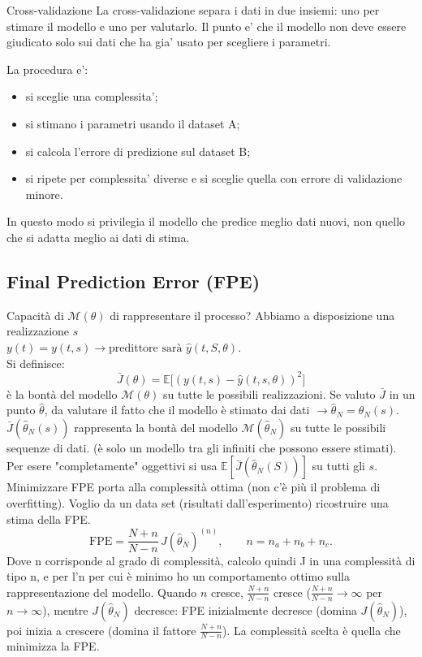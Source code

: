 \documentclass[11pt,a4paper]{article}
\begin{document}
\begin{spiegazione}{Cross-validazione}
La cross-validazione separa i dati in due insiemi: uno per stimare il modello e uno per valutarlo. Il punto e' che il modello non deve essere giudicato solo sui dati che ha gia' usato per scegliere i parametri.

La procedura e':
\begin{itemize}
  \item si sceglie una complessita';
  \item si stimano i parametri usando il dataset A;
  \item si calcola l'errore di predizione sul dataset B;
  \item si ripete per complessita' diverse e si sceglie quella con errore di validazione minore.
\end{itemize}
In questo modo si privilegia il modello che predice meglio dati nuovi, non quello che si adatta meglio ai dati di stima.
\end{spiegazione}




\subsection{Final Prediction Error (FPE)}
Capacità di $\mathcal{M}(\theta)$ di rappresentare il processo? Abbiamo a disposizione una realizzazione $s$ \\
$y(t) = y(t,s) \rightarrow \text{predittore sarà }\hat y(t,S, \theta)$. \\
Si definisce:
\[
\bar J(\theta)=\mathbb{E}\bigl[(y(t,s)-\hat y(t,s,\theta))^2]
\]
è la bontà del modello $\mathcal{M}(\theta)$ su tutte le possibili realizzazioni. Se valuto  $\bar J$ in un punto $\hat \theta$, da valutare il fatto che il modello è stimato dai dati $\rightarrow \hat \theta_N = \hat \theta_N(s)$.\\
$\bar J(\hat \theta_N(s))$ rappresenta la bontà del modello $\mathcal{M}(\hat \theta_N)$ su tutte le possibili sequenze di dati. (è solo un modello tra gli infiniti che possono essere stimati).
Per esere "completamente" oggettivi si usa $\mathbb{E}[\bar J(\hat\theta_N(S))]$ su tutti gli $s$.
Minimizzare FPE porta alla complessità ottima (non c'è più il problema di overfitting). Voglio da un data set (risultati dall'esperimento) ricostruire una stima della FPE.
\[
 \mathrm{FPE}=\frac{N+n}{N-n}\,J(\hat\theta_N)^{(n)},\qquad n=n_a+n_b+n_c.
\]
Dove n corrisponde al grado di complessità, calcolo quindi J in una complessità di tipo n, e per l'n per cui è minimo ho un comportamento ottimo sulla rappresentazione del modello.
Quando $n$ cresce, $\tfrac{N+n}{N-n}$ cresce ($\tfrac{N+n}{N-n} \to \infty$ per $n\to\infty$), mentre $J(\hat\theta_N)$ decresce: FPE inizialmente decresce (domina $J(\hat \theta_N)$), poi inizia a crescere (domina il fattore $\tfrac{N+n}{N-n}$). La complessità scelta è quella che minimizza la FPE.
\end{document}
